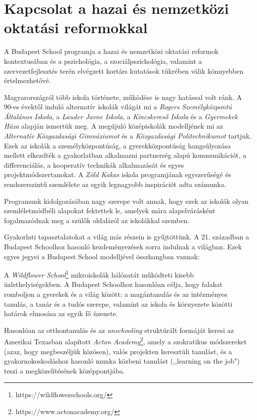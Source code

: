 \section{Kapcsolat a hazai és nemzetközi oktatási reformokkal}
\label{sec:kapcsolat_reformokkal}

A Budapest School programja a hazai és nemzetközi oktatási reformok kontextusában és a pszichológia, a szociálpszichológia, valamint a szervezetfejlesztés terén elvégzett kortárs kutatások tükrében válik könnyebben értelmezhetővé.

Magyarországról több iskola története, működése is nagy hatással volt ránk. A 90-es évektől induló alternatív iskolák világát mi a \emph{Rogers Személyközpontú Általános Iskola}, a \emph{Lauder Javne Iskola}, a \emph{Kincskereső Iskola} és a \emph{Gyermekek Háza} alapján ismertük meg. A megújuló középiskolák modelljének mi az \emph{Alternatív Közgazdasági Gimnáziumot} és a \emph{Közgazdasági Politechnikumot} tartjuk. Ezek az iskolák a személyközpontúság, a gyerekközpontúság hangsúlyozása mellett elkezdték a gyakorlatban alkalmazni partnerség alapú kommunikációt, a differenciálás, a kooperatív technikák alkalmazását és egyes projektmódszertanokat. A \emph{Zöld Kakas} iskola programjának egyszerűségé és rendszerszintű szemlélete az egyik legnagyobb inspirációt adta számunka.

Programunk kidolgozásában nagy szerepe volt annak, hogy ezek az iskolák olyan szemléletmódbéli alapokat fektettek le, amelyek mára alapelvárásként fogalmazódnak meg a szülők oldaláról az iskolákkal szemben.

Gyakorlati tapasztalatokat a világ más részein is gyűjtöttünk. A 21. században a Budapest Schoolhoz hasonló kezdeményezések sorra indulnak a világban. Ezek egyes jegyei a Budapest School modelljével összhangban vannak:

A \emph{Wildflower School}\footnote{https://wildflowerschools.org/} mikroiskolák hálózatát működteti kisebb üzlethelyiségekben. A Budapest Schoolhoz hasonlóan célja, hogy falakat romboljon a gyerekek és a világ között: a magántanulás és az intézményes tanulás, a tanár és a tudós szerepe, valamint az iskola és környezete közötti határok elmosása az egyik fő üzenete.

Hasonlóan az otthontanulás és az  \emph{unschooling} struktúrált formáját keresi az Amerikai Texasban alapított \emph{Acton Academy}\footnote{https://www.actonacademy.org/}, amely a szokratikus módszereket (azaz, hogy megbeszéljük közösen), valós projekten keresztüli tanulást, és a gyakornokoskodáshoz hasonló munka közbeni tanulást (,,learning on the job") teszi a megközelítésének középpontjába.

